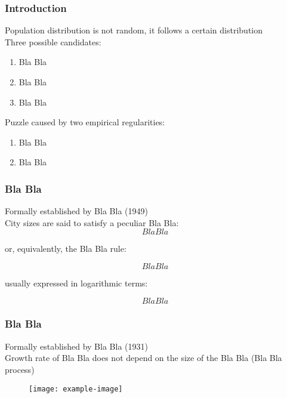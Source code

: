 \documentclass{beamer}
\begin{document}
\begin{frame}
\frametitle{Introduction}
Population distribution is not random, it follows a certain distribution\\
Three possible candidates:\\
\begin{enumerate}
\item Bla Bla \pause
\item Bla Bla \pause
\item Bla Bla
\end{enumerate}
Puzzle caused by two empirical regularities:\\
\begin{enumerate}
\item Bla Bla \pause
\item Bla Bla
\end{enumerate}
\end{frame}

\begin{frame}
\frametitle{Bla Bla}
Formally established by Bla Bla (1949)\\
City sizes are said to satisfy a peculiar Bla Bla:\\

\begin{equation*}
Bla Bla
\end{equation*}

or, equivalently, the Bla Bla rule:

\begin{equation*}
Bla Bla
\end{equation*}

usually expressed in logarithmic terms:

\begin{equation*}
Bla Bla
\end{equation*}

\end{frame}

\begin{frame}
\frametitle{Bla Bla}
Formally established by Bla Bla (1931)\\
Growth rate of Bla Bla does not depend on the size of the Bla Bla (Bla Bla process)\\

\begin{figure}[h!]
\begin{center}
\texttt{[image: example-image]}
\end{center}
\end{figure}

\end{frame}
\end{document}
